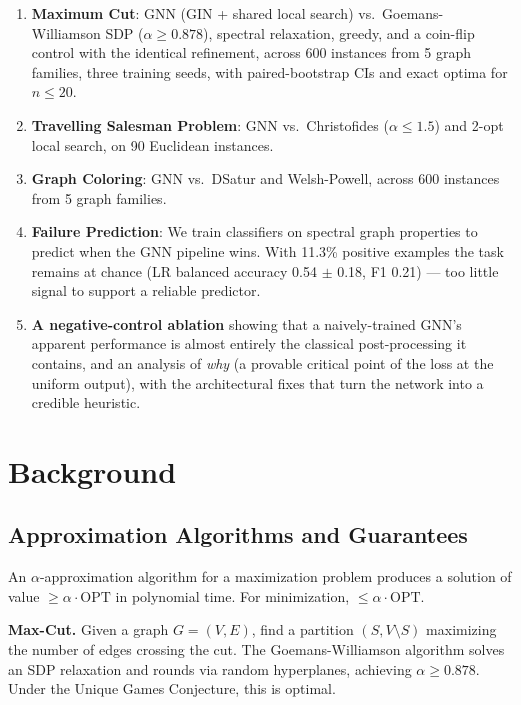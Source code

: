 \documentclass[11pt]{article}
\begin{document}
\begin{enumerate}
    \item \textbf{Maximum Cut}: GNN (GIN + shared local search) vs.\ Goemans-Williamson SDP ($\alpha \geq 0.878$), spectral relaxation, greedy, and a coin-flip control with the identical refinement, across 600 instances from 5 graph families, three training seeds, with paired-bootstrap CIs and exact optima for $n \leq 20$.
    \item \textbf{Travelling Salesman Problem}: GNN vs.\ Christofides ($\alpha \leq 1.5$) and 2-opt local search, on 90 Euclidean instances.
    \item \textbf{Graph Coloring}: GNN vs.\ DSatur \cite{brelaz1979new} and Welsh-Powell, across 600 instances from 5 graph families.
    \item \textbf{Failure Prediction}: We train classifiers on spectral graph properties to predict when the GNN pipeline wins. With 11.3\% positive examples the task remains at chance (LR balanced accuracy 0.54 $\pm$ 0.18, F1 0.21) --- too little signal to support a reliable predictor.
    \item \textbf{A negative-control ablation} showing that a naively-trained GNN's apparent performance is almost entirely the classical post-processing it contains, and an analysis of \emph{why} (a provable critical point of the loss at the uniform output), with the architectural fixes that turn the network into a credible heuristic.
\end{enumerate}

\section{Background}

\subsection{Approximation Algorithms and Guarantees}

An $\alpha$-approximation algorithm for a maximization problem produces a solution of value $\geq \alpha \cdot \text{OPT}$ in polynomial time.
For minimization, $\leq \alpha \cdot \text{OPT}$.

\textbf{Max-Cut.} Given a graph $G = (V, E)$, find a partition $(S, V \setminus S)$ maximizing the number of edges crossing the cut.
The Goemans-Williamson algorithm \cite{goemans1995improved} solves an SDP relaxation and rounds via random hyperplanes, achieving $\alpha \geq 0.878$.
Under the Unique Games Conjecture, this is optimal.
\end{document}
